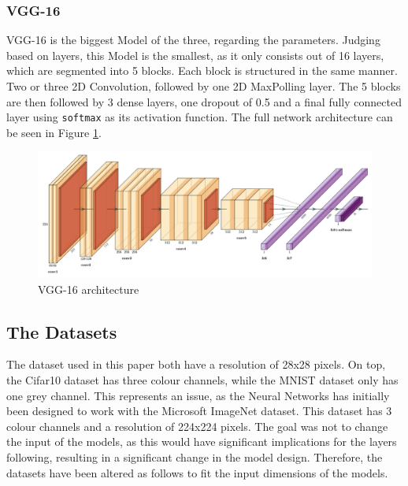 \documentclass[conference]{IEEEtran}
\begin{document}
\subsubsection{VGG-16}
VGG-16 is the biggest Model of the three, regarding the parameters. 
Judging based on layers, this Model is the smallest, as it only consists out of 16 layers, which are segmented into 5 blocks. 
Each block is structured in the same manner. Two or three 2D Convolution, followed by one 2D MaxPolling layer. 
The 5 blocks are then followed by 3 dense layers, one dropout of 0.5 and a final  fully connected layer using \verb|softmax| as its activation function. 
The full network architecture can be seen in Figure \ref{fig:x VGG architecture}. \cite{simonyan_very_2015}

\begin{figure}[!htbp]
    \centering
    \includegraphics[scale=0.07]{img/VGG.png}
    \caption{VGG-16 architecture \cite{noauthor_forks_nodate}}
    \label{fig:x VGG architecture}
\end{figure}

\subsection{The Datasets}\label{ID}

The dataset used in this paper both have a resolution of 28x28 pixels. On top, the Cifar10 dataset has three colour channels, while the MNIST dataset only has one grey channel.
This represents an issue, as the Neural Networks has initially been designed to work with the Microsoft ImageNet dataset. This dataset has 3 colour channels and a resolution of 224x224 pixels.
The goal was not to change the input of the models, as this would have significant implications for the layers following, resulting in a significant change in the model design.
Therefore, the datasets have been altered as follows to fit the input dimensions of the models.
\end{document}
